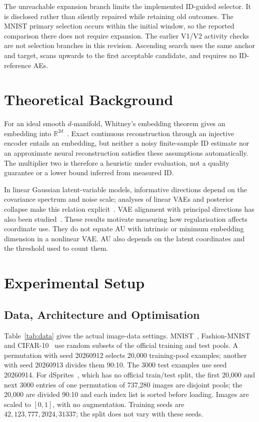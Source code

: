 The unreachable expansion branch limits the implemented ID-guided
selector. It is disclosed rather than silently repaired while retaining
old outcomes. The MNIST primary selection occurs within the initial
window, so the reported comparison there does not require expansion.
The earlier V1/V2 activity checks are not selection branches in this
revision. Ascending search uses the same anchor and target, scans upwards
to the first acceptable candidate, and requires no ID-reference AEs.

\section{Theoretical Background}\label{sec:theory}
For an ideal smooth $d$-manifold, Whitney's embedding theorem gives an
embedding into $\mathbb R^{2d}$~\cite{whitney1944}. Exact continuous
reconstruction through an injective encoder entails an embedding, but
neither a noisy finite-sample ID estimate nor an approximate neural
reconstruction satisfies these assumptions automatically. The multiplier
two is therefore a heuristic under evaluation, not a quality guarantee or
a lower bound inferred from measured ID.

In linear Gaussian latent-variable models, informative directions depend
on the covariance spectrum and noise scale; analyses of linear VAEs and
posterior collapse make this relation explicit~\cite{tippingbishop1999ppca,lucas2019elbo}.
VAE alignment with principal directions has also been
studied~\cite{rolinek2019pca}. These results motivate measuring how
regularisation affects coordinate use. They do not equate AU with
intrinsic or minimum embedding dimension in a nonlinear VAE. AU also
depends on the latent coordinates and the threshold used to count them.

\section{Experimental Setup}\label{sec:setup}

\subsection{Data, Architecture and Optimisation}
Table~\ref{tab:data} gives the actual image-data settings.
MNIST~\cite{lecun1998}, Fashion-MNIST~\cite{xiao2017fashion} and
CIFAR-10~\cite{krizhevsky2009learning} use random subsets of the official
training and test pools. A permutation with seed 20260912 selects 20,000
training-pool examples; another with seed 20260913 divides them 90:10.
The 3000 test examples use seed 20260914. For
dSprites~\cite{matthey2017dsprites}, which has no official train/test
split, the first 20,000 and next 3000 entries of one permutation of
737,280 images are disjoint pools; the 20,000 are divided 90:10 and each
index list is sorted before loading. Images are scaled to $[0,1]$, with
no augmentation. Training seeds are $42,123,777,2024,31337$; the split
does not vary with these seeds.

